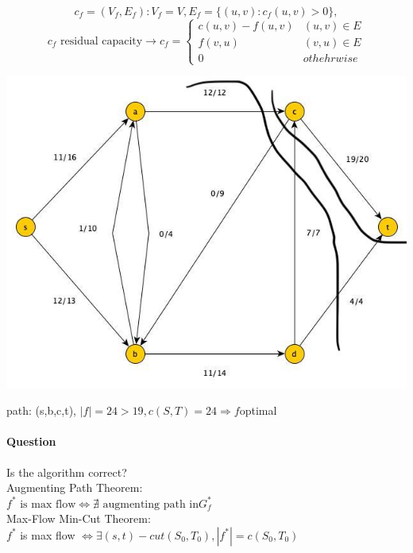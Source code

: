 $$c_f = (V_f,E_f): 
V_f = V, 
E_f = \{(u,v): c_f(u,v) > 0\},$$$$ 
c_f \text{ residual capacity} \rightarrow 
c_f = \begin{cases} c(u,v)-f(u,v) & (u,v)\in E \\
f(v,u) & (v,u)\in E \\
0 & othehrwise
\end{cases}$$

\begin{center}
	\includegraphics[scale=0.5]{img/graph12}
\end{center}
path: (s,b,c,t), $|f| = 24 > 19, c(S,T) = 24 \Rightarrow f $optimal 

\paragraph{Question} Is the algorithm correct? \\

Augmenting Path Theorem: \\

$f^* \text{ is max flow} \Leftrightarrow \nexists\text{ augmenting path in} G^*_f$ \\

Max-Flow Min-Cut Theorem: \\
$f^*$ is max flow $\Leftrightarrow \exists (s,t)-cut (S_0,T_0), |f^*| = c(S_0,T_0)$

